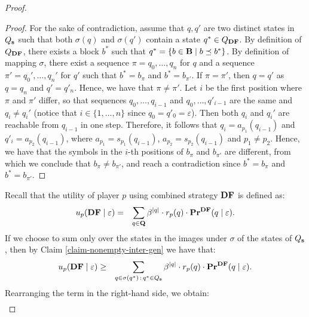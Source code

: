 \begin{proof}
\begin{proof}
For the sake of contradiction, assume that
$q,q'$ are two distinct states in $Q_{\mathbf{s}}$ such that both $\sigma(q)$ and $\sigma(q')$ contain a state $q^* \in Q_{\text{\rm {\bf DF}}}$. By definition of $Q_{\text{\rm {\bf DF}}}$, there exists a block 
$b^*$ such that $q^* = \{b \in \mathbf{B} \mid b \preceq b^*\}$.
By definition of mapping $\sigma$, there exist a sequence $\pi = q_0,\dots,q_n$ for $q$ and a sequence $\pi' = q_0',\dots,q_n'$ for $q'$ such that $b^* = b_\pi$ and $b^* = b_{\pi'}$. If 
$\pi = \pi'$, then $q = q'$ as $q = q_n$ and $q' = q'_n$. Hence, we have that $\pi \neq \pi'$.
Let $i$ be the first position where $\pi$ and $\pi'$ differ,
so that 
sequences $q_0,\dots,q_{i-1}$ and $q_0,\dots,q'_{i-1}$ are the same and $q_i \neq q_i'$ (notice that $i \in \{1, \ldots, n\}$ since $q_0 = q'_0 = \varepsilon$).
Then both $q_i$ and $q_i'$ are reachable from $q_{i-1}$ in one step. Therefore, it follows that 
$q_i = a_{p_1}(q_{i-1})$ and $q'_i = a_{p_2}(q_{i-1})$, where $a_{p_1} = s_{p_1}(q_{i-1})$, $a_{p_2} = s_{p_2}(q_{i-1})$ and $p_1 \neq p_2$. Hence, we have that the symbols in the $i$-th positions of $b_\pi$ and $b_{\pi'}$ are different, from which we conclude that $b_\pi \neq b_{\pi'}$, and reach a contradiction since $b^* = b_\pi$ and $b^* = b_{\pi'}$.
\end{proof}
Recall that the utility of player $p$ using combined strategy $\text{\rm {\bf DF}}$ 
is defined as:
\begin{eqnarray*}
u_p(\text{\rm {\bf DF}} \mid \varepsilon) & = & \sum_{q \in \mathbf{Q}} \beta^{|q|} \cdot  r_p(q) \cdot \mathbf{Pr}^{\text{\rm {\bf DF}}}(q \mid \varepsilon).
\end{eqnarray*}
If we choose to sum only over the states in the images under $\sigma$ of the states of $Q_{\mathbf{s}}$, then by Claim \ref{claim-nonempty-inter-gen} we have that:
\begin{eqnarray*}
u_p(\text{\rm {\bf DF}} \mid \varepsilon) & \geq & \sum_{q \in \sigma(q^*) \,:\, q^* \in Q_{\mathbf{s}}} \beta^{|q|} \cdot  r_p(q) \cdot \mathbf{Pr}^{\text{\rm {\bf DF}}}(q \mid \varepsilon).
\end{eqnarray*}
Rearranging the term in the right-hand side, we obtain:
\begin{eqnarray*}

\end{eqnarray*}
\end{proof}
